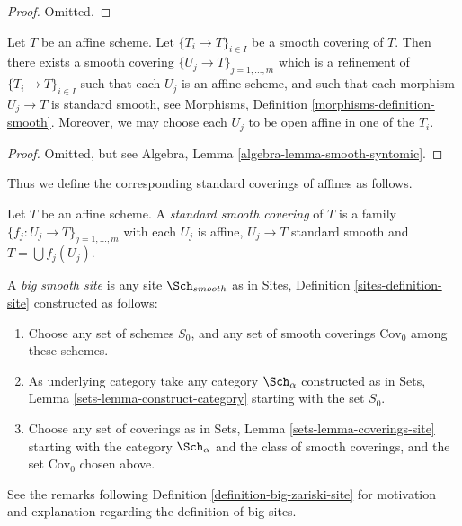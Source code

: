 \begin{proof}
Omitted.
\end{proof}

\begin{lemma}
\label{lemma-smooth-affine}
Let $T$ be an affine scheme.
Let $\{T_i \to T\}_{i \in I}$ be a smooth covering of $T$.
Then there exists a smooth covering
$\{U_j \to T\}_{j = 1, \ldots, m}$ which is a refinement
of $\{T_i \to T\}_{i \in I}$ such that each $U_j$ is an affine
scheme, and such that each morphism $U_j \to T$ is standard
smooth, see Morphisms, Definition \ref{morphisms-definition-smooth}.
Moreover, we may choose each $U_j$ to be open affine in one of the $T_i$.
\end{lemma}

\begin{proof}
Omitted, but see Algebra, Lemma \ref{algebra-lemma-smooth-syntomic}.
\end{proof}

\noindent
Thus we define the corresponding standard coverings of affines as follows.

\begin{definition}
\label{definition-standard-smooth}
Let $T$ be an affine scheme. A {\it standard smooth covering}
of $T$ is a family $\{f_j : U_j \to T\}_{j = 1, \ldots, m}$
with each $U_j$ is affine, $U_j \to T$ standard smooth
and $T = \bigcup f_j(U_j)$.
\end{definition}

\begin{definition}
\label{definition-big-smooth-site}
A {\it big smooth site} is any site $\Sch_{smooth}$ as in
Sites, Definition \ref{sites-definition-site} constructed as follows:
\begin{enumerate}
\item Choose any set of schemes $S_0$, and any set of smooth coverings
$\text{Cov}_0$ among these schemes.
\item As underlying category take any category $\Sch_\alpha$
constructed as in Sets, Lemma \ref{sets-lemma-construct-category}
starting with the set $S_0$.
\item Choose any set of coverings as in
Sets, Lemma \ref{sets-lemma-coverings-site} starting with the
category $\Sch_\alpha$ and the class of smooth coverings,
and the set $\text{Cov}_0$ chosen above.
\end{enumerate}
\end{definition}

\noindent
See the remarks following Definition \ref{definition-big-zariski-site}
for motivation and explanation regarding the definition of big sites.

